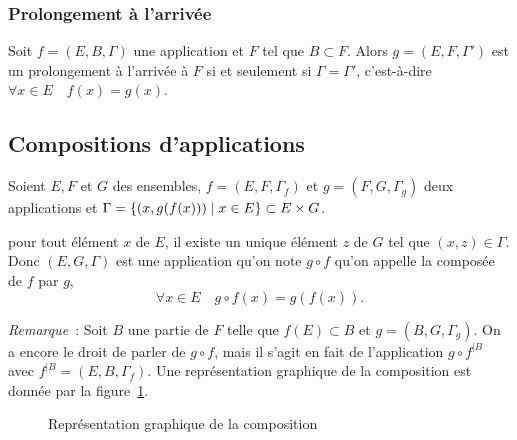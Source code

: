 \subsubsection{Prolongement à l'arrivée}\label{chap3-subsubsec:prolongementarr}

Soit \(f = (E, B, \Gamma)\) une application et \(F\) tel que \(B \subset{}F\). Alors
\(g = (E, F, \Gamma')\) est un prolongement à l'arrivée à \(F\) si et seulement si
\(\Gamma = \Gamma'\), c'est-à-dire \(\forall{}x \in{}E \quad f(x) = g(x)\).

\subsection{Compositions d'applications}\label{chap3-subsec:compapp}

\begin{defdef}
  Soient \(E, F\) et \(G\) des ensembles, \(f = (E, F, \Gamma_f)\) et \(g = (F,G,
  \Gamma_g)\) deux applications et \(\Gamma = \left\{(x, g(f(x)))\mathrel{}\middle|\mathrel{}x \in{}E\right\} \subset{}
  E \times G\).
\end{defdef}

pour tout élément \(x\) de \(E\), il existe un unique élément \(z\) de \(G\) tel
que \((x, z) \in{}\Gamma\). Donc \((E, G, \Gamma)\) est une application qu'on note
\(g \circ f\) qu'on appelle la composée de \(f\) par \(g\),
\begin{equation}
  \forall{}x \in{}E \quad g \circ f(x) = g(f(x)).
\end{equation}

\emph{Remarque}~: Soit \(B\) une partie de \(F\) telle que \(f(E) \subset{}B\) et
\(g = (B, G, \Gamma_g)\). On a encore le droit de parler de \(g \circ f\), mais il
s'agit en fait de l'application \(g \circ f^{|B}\) avec \( f^{|B} = (E, B,
\Gamma_f)\). Une représentation graphique de la composition est donnée par la
figure~\ref{chap3-fig:compose}.

\begin{figure}
  \centering
  \caption{Représentation graphique de la composition}\label{chap3-fig:compose}
\end{figure}

